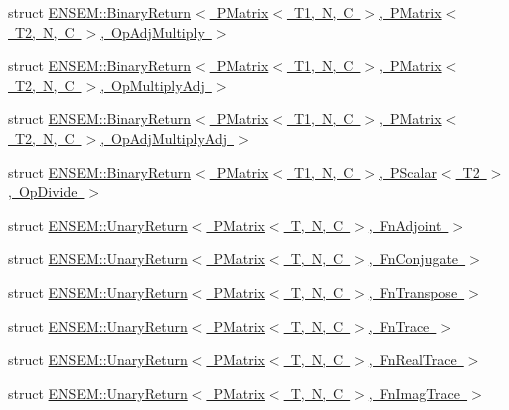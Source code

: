 \begin{DoxyCompactItemize}
\item 
struct \mbox{\hyperlink{structENSEM_1_1BinaryReturn_3_01PMatrix_3_01T1_00_01N_00_01C_01_4_00_01PMatrix_3_01T2_00_01N_00_0c796edb815901ee07e52957841490ec}{E\+N\+S\+E\+M\+::\+Binary\+Return$<$ P\+Matrix$<$ T1, N, C $>$, P\+Matrix$<$ T2, N, C $>$, Op\+Adj\+Multiply $>$}}
\item 
struct \mbox{\hyperlink{structENSEM_1_1BinaryReturn_3_01PMatrix_3_01T1_00_01N_00_01C_01_4_00_01PMatrix_3_01T2_00_01N_00_d45cd1d9e02779a140d03751534bd050}{E\+N\+S\+E\+M\+::\+Binary\+Return$<$ P\+Matrix$<$ T1, N, C $>$, P\+Matrix$<$ T2, N, C $>$, Op\+Multiply\+Adj $>$}}
\item 
struct \mbox{\hyperlink{structENSEM_1_1BinaryReturn_3_01PMatrix_3_01T1_00_01N_00_01C_01_4_00_01PMatrix_3_01T2_00_01N_00_79410733ba13e6def1042c111bee3e0e}{E\+N\+S\+E\+M\+::\+Binary\+Return$<$ P\+Matrix$<$ T1, N, C $>$, P\+Matrix$<$ T2, N, C $>$, Op\+Adj\+Multiply\+Adj $>$}}
\item 
struct \mbox{\hyperlink{structENSEM_1_1BinaryReturn_3_01PMatrix_3_01T1_00_01N_00_01C_01_4_00_01PScalar_3_01T2_01_4_00_01OpDivide_01_4}{E\+N\+S\+E\+M\+::\+Binary\+Return$<$ P\+Matrix$<$ T1, N, C $>$, P\+Scalar$<$ T2 $>$, Op\+Divide $>$}}
\item 
struct \mbox{\hyperlink{structENSEM_1_1UnaryReturn_3_01PMatrix_3_01T_00_01N_00_01C_01_4_00_01FnAdjoint_01_4}{E\+N\+S\+E\+M\+::\+Unary\+Return$<$ P\+Matrix$<$ T, N, C $>$, Fn\+Adjoint $>$}}
\item 
struct \mbox{\hyperlink{structENSEM_1_1UnaryReturn_3_01PMatrix_3_01T_00_01N_00_01C_01_4_00_01FnConjugate_01_4}{E\+N\+S\+E\+M\+::\+Unary\+Return$<$ P\+Matrix$<$ T, N, C $>$, Fn\+Conjugate $>$}}
\item 
struct \mbox{\hyperlink{structENSEM_1_1UnaryReturn_3_01PMatrix_3_01T_00_01N_00_01C_01_4_00_01FnTranspose_01_4}{E\+N\+S\+E\+M\+::\+Unary\+Return$<$ P\+Matrix$<$ T, N, C $>$, Fn\+Transpose $>$}}
\item 
struct \mbox{\hyperlink{structENSEM_1_1UnaryReturn_3_01PMatrix_3_01T_00_01N_00_01C_01_4_00_01FnTrace_01_4}{E\+N\+S\+E\+M\+::\+Unary\+Return$<$ P\+Matrix$<$ T, N, C $>$, Fn\+Trace $>$}}
\item 
struct \mbox{\hyperlink{structENSEM_1_1UnaryReturn_3_01PMatrix_3_01T_00_01N_00_01C_01_4_00_01FnRealTrace_01_4}{E\+N\+S\+E\+M\+::\+Unary\+Return$<$ P\+Matrix$<$ T, N, C $>$, Fn\+Real\+Trace $>$}}
\item 
struct \mbox{\hyperlink{structENSEM_1_1UnaryReturn_3_01PMatrix_3_01T_00_01N_00_01C_01_4_00_01FnImagTrace_01_4}{E\+N\+S\+E\+M\+::\+Unary\+Return$<$ P\+Matrix$<$ T, N, C $>$, Fn\+Imag\+Trace $>$}}

\end{DoxyCompactItemize}
